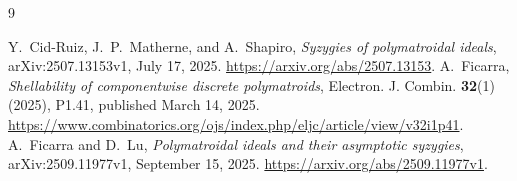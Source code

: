 \documentclass[11pt]{article}
\theoremstyle{remark}\newtheorem{remark}[theorem]{Remark}
\begin{document}
\begin{thebibliography}{9}
\raggedright
{} Y.~Cid-Ruiz, J.~P.~Matherne, and A.~Shapiro,
\emph{Syzygies of polymatroidal ideals}, arXiv:2507.13153v1, July 17, 2025.
\url{https://arxiv.org/abs/2507.13153}.
 A.~Ficarra,
\emph{Shellability of componentwise discrete polymatroids},
Electron. J. Combin. \textbf{32}(1) (2025), P1.41, published March 14, 2025.
\url{https://www.combinatorics.org/ojs/index.php/eljc/article/view/v32i1p41}.
 A.~Ficarra and D.~Lu,
\emph{Polymatroidal ideals and their asymptotic syzygies},
arXiv:2509.11977v1, September 15, 2025.
\url{https://arxiv.org/abs/2509.11977v1}.
\end{thebibliography}
\end{document}
